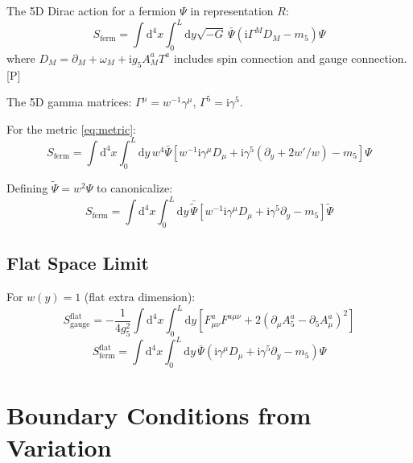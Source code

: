 \documentclass[11pt,a4paper]{article}
\newcommand{\dd}{\mathrm{d}}
\newcommand{\ii}{\mathrm{i}}
\begin{document}
The 5D Dirac action for a fermion $\Psi$ in representation $R$:
\begin{equation}
S_{\text{ferm}} = \int \dd^4x \int_0^L \dd y \sqrt{-G}\, \bar{\Psi}
\left( \ii \Gamma^M D_M - m_5 \right) \Psi
\label{eq:fermion-action}
\end{equation}
where $D_M = \partial_M + \omega_M + \ii g_5 A_M^a T^a$ includes spin connection
and gauge connection. [P]

The 5D gamma matrices: $\Gamma^\mu = w^{-1}\gamma^\mu$, $\Gamma^5 = \ii\gamma^5$.

For the metric \eqref{eq:metric}:
\begin{equation}
S_{\text{ferm}} = \int \dd^4x \int_0^L \dd y\, w^4 \bar{\Psi}
\left[ w^{-1}\ii\gamma^\mu D_\mu + \ii\gamma^5(\partial_y + 2w'/w) - m_5 \right] \Psi
\label{eq:fermion-expanded}
\end{equation}

Defining $\tilde{\Psi} = w^2 \Psi$ to canonicalize:
\begin{equation}
S_{\text{ferm}} = \int \dd^4x \int_0^L \dd y\, \bar{\tilde{\Psi}}
\left[ w^{-1}\ii\gamma^\mu D_\mu + \ii\gamma^5 \partial_y - m_5 \right] \tilde{\Psi}
\label{eq:fermion-canonical}
\end{equation}

\subsection{Flat Space Limit}

For $w(y) = 1$ (flat extra dimension):
\begin{equation}
S_{\text{gauge}}^{\text{flat}} = -\frac{1}{4g_5^2} \int \dd^4x \int_0^L \dd y
\left[ F_{\mu\nu}^a F^{a\mu\nu} + 2 (\partial_\mu A_5^a - \partial_5 A_\mu^a)^2 \right]
\label{eq:gauge-flat}
\end{equation}
\begin{equation}
S_{\text{ferm}}^{\text{flat}} = \int \dd^4x \int_0^L \dd y\, \bar{\Psi}
\left( \ii\gamma^\mu D_\mu + \ii\gamma^5 \partial_y - m_5 \right) \Psi
\label{eq:fermion-flat}
\end{equation}

\section{Boundary Conditions from Variation}
\label{sec:bc-variation}
\end{document}
